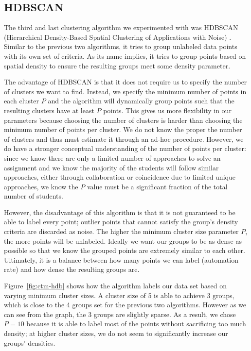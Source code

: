 \subsection{HDBSCAN}
\label{sec:ctm-hdb}

The third and last clustering algorithm we experimented with was HDBSCAN (Hierarchical Density-Based Spatial Clustering of Applications with Noise) \cite{McInnes2017}. Similar to the previous two algorithms, it tries to group unlabeled data points with its own set of criteria. As its name implies, it tries to group points based on spatial density to ensure the resulting groups meet some density parameter.

The advantage of HDBSCAN is that it does not require us to specify the number of clusters we want to find. Instead, we specify the minimum number of points in each cluster $P$ and the algorithm will dynamically group points such that the resulting clusters have at least $P$ points. This gives us more flexibility in our parameters because choosing the number of clusters is harder than choosing the minimum number of points per cluster. We do not know the proper the number of clusters and thus must estimate it through an ad-hoc procedure. However, we do have a stronger conceptual understanding of the number of points per cluster: since we know there are only a limited number of approaches to solve an assignment and we know the majority of the students will follow similar approaches, either through collaboration or coincidence due to limited unique approaches, we know the $P$ value must be a significant fraction of the total number of students.

However, the disadvantage of this algorithm is that it is not guaranteed to be able to label every point; outlier points that cannot satisfy the group's density criteria are discarded as noise. The higher the minimum cluster size parameter $P$, the more points will be unlabeled. Ideally we want our groups to be as dense as possible so that we know the grouped points are extremely similar to each other. Ultimately, it is a balance between how many points we can label (automation rate) and how dense the resulting groups are.

Figure~\ref{fig:ctm-hdb} shows how the algorithm labels our data set based on varying minimum cluster sizes. A cluster size of 5 is able to achieve 3 groups, which is close to the 4 groups set for the previous two algorithms. However as we can see from the graph, the 3 groups are slightly sparse. As a result, we chose $P=10$ because it is able to label most of the points without sacrificing too much density; at higher cluster sizes, we do not seem to significantly increase our groups' densities.


